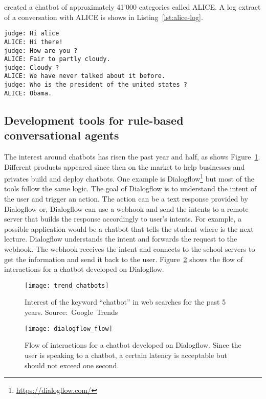 \citet{wallace2009anatomy} created a chatbot of approximately 41'000 categories called ALICE. A log extract of a conversation with ALICE is shows in Listing~\ref{lst:alice-log}.
\begin{lstlisting}[label={lst:alice-log}]
judge: Hi alice
ALICE: Hi there!
judge: How are you ?
ALICE: Fair to partly cloudy.
judge: Cloudy ?
ALICE: We have never talked about it before.
judge: Who is the president of the united states ?
ALICE: Obama.
\end{lstlisting}

\subsection{Development tools for rule-based conversational agents}
The interest around chatbots has risen the past year and half, as shows Figure~\ref{fig:trend_chatbot}. Different products appeared since then on the market to help businesses and privates build and deploy chatbots. One example is Dialogflow\footnote{\url{https://dialogflow.com/}} but most of the tools follow the same logic. The goal of Dialogflow is to understand the intent of the user and trigger an action. The action can be a text response provided by Dialogflow or, Dialogflow can use a webhook and send the intents to a remote server that builds the response accordingly to user's intents.
For example, a possible application would be a chatbot that tells the student where is the next lecture. Dialogflow understands the intent and forwards the request to the webhook. The webhook receives the intent and connects to the school servers to get the information and send it back to the user. Figure~\ref{fig:dialogflow} shows the flow of interactions for a chatbot developed on Dialogflow.

\begin{figure}[b]
    \centering
    \texttt{[image: trend\_chatbots]}
    \decoRule
    \caption[Web search interest for ``chatbot'']{Interest of the keyword ``chatbot'' in web searches for the past 5 years. Source:~Google~Trends}
    \label{fig:trend_chatbot}
\end{figure}

\begin{figure}
    \centering
    \texttt{[image: dialogflow\_flow]}
    \decoRule
    \caption[Dialogflow based chatbot]{Flow of interactions for a chatbot developed on Dialogflow. Since the user is speaking to a chatbot, a certain latency is acceptable but should not exceed one second.}
    \label{fig:dialogflow}
\end{figure}


